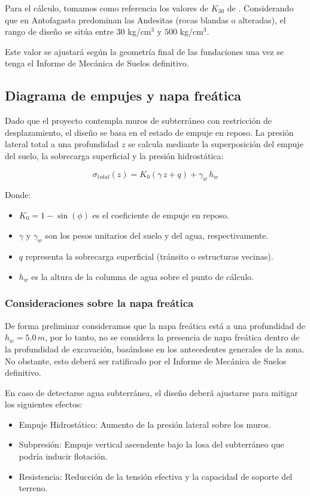 Para el cálculo, tomamos como referencia los valores de $K_{30}$ de \cite{CYPE2019Balasto}. Considerando que en Antofagasta predominan las Andesitas (rocas blandas o alteradas), el rango de diseño se sitúa entre $30$ kg/cm$^3$ y $500$ kg/cm$^3$. 

Este valor se ajustará según la geometría final de las fundaciones una vez se tenga el Informe de Mecánica de Suelos definitivo.
\subsection{Diagrama de empujes y napa freática}

Dado que el proyecto contempla muros de subterráneo con restricción de desplazamiento, el diseño se basa en el estado de empuje en reposo. La presión lateral total a una profundidad $z$ se calcula mediante la superposición del empuje del suelo, la sobrecarga superficial y la presión hidrostática:

\begin{equation}
\sigma_{total}(z) = K_0 (\gamma \, z + q) + \gamma_w \, h_w
\end{equation}

Donde:
\begin{itemize}
    \item $K_0 = 1 - \sin(\phi)$ es el coeficiente de empuje en reposo.
    \item $\gamma$ y $\gamma_w$ son los pesos unitarios del suelo y del agua, respectivamente.
    \item $q$ representa la sobrecarga superficial (tránsito o estructuras vecinas).
    \item $h_w$ es la altura de la columna de agua sobre el punto de cálculo.
\end{itemize}



\subsubsection*{Consideraciones sobre la napa freática}

De forma preliminar consideramos que la napa freática está a una profundidad de $h_w = 5.0 \, m$, por lo tanto, no se considera la presencia de napa freática dentro de la profundidad de excavación, basándose en los antecedentes generales de la zona. No obstante, esto deberá ser ratificado por el Informe de Mecánica de Suelos definitivo. 

En caso de detectarse agua subterránea, el diseño deberá ajustarse para mitigar los siguientes efectos:
\begin{itemize}
    \item Empuje Hidrostático: Aumento de la presión lateral sobre los muros.
    \item Subpresión: Empuje vertical ascendente bajo la losa del subterráneo que podría inducir flotación.
    \item Resistencia: Reducción de la tensión efectiva y la capacidad de soporte del terreno.
\end{itemize}

